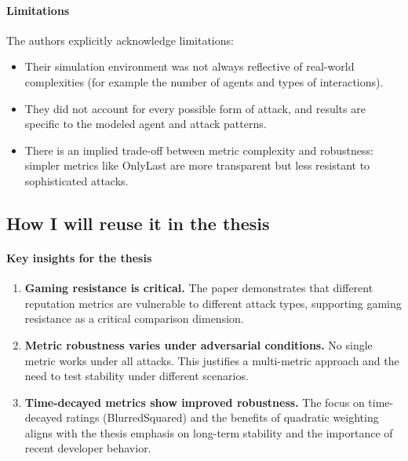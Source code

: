 \documentclass[11pt,a4paper]{article}
\begin{document}
\paragraph{Limitations}
The authors explicitly acknowledge limitations:
\begin{itemize}[leftmargin=*]
  \item Their simulation environment was not always reflective of real-world complexities (for example the number of agents and types of interactions).
  \item They did not account for every possible form of attack, and results are specific to the modeled agent and attack patterns.
  \item There is an implied trade-off between metric complexity and robustness: simpler metrics like OnlyLast are more transparent but less resistant to sophisticated attacks.
\end{itemize}

\subsection{How I will reuse it in the thesis}
\paragraph{Key insights for the thesis}
\begin{enumerate}[leftmargin=*]
  \item \textbf{Gaming resistance is critical.} The paper demonstrates that different reputation metrics are vulnerable to different attack types, supporting gaming resistance as a critical comparison dimension.
  \item \textbf{Metric robustness varies under adversarial conditions.} No single metric works under all attacks. This justifies a multi-metric approach and the need to test stability under different scenarios.
  \item \textbf{Time-decayed metrics show improved robustness.} The focus on time-decayed ratings (BlurredSquared) and the benefits of quadratic weighting aligns with the thesis emphasis on long-term stability and the importance of recent developer behavior.
\end{enumerate}
\end{document}
